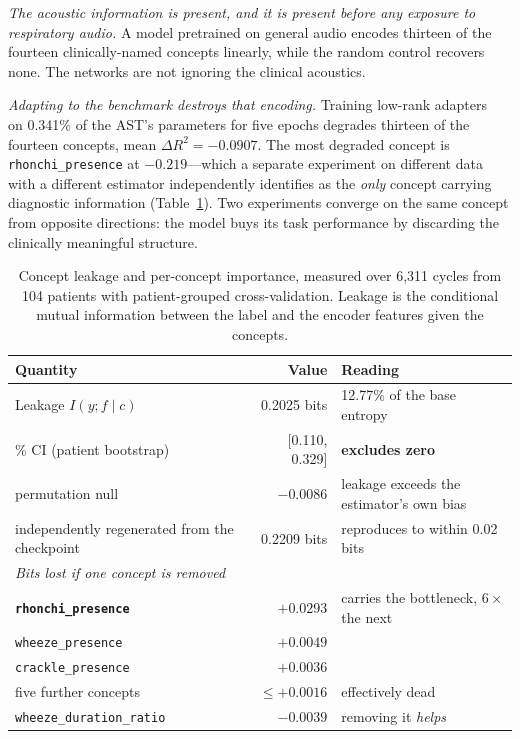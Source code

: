 \documentclass[journal,onecolumn]{IEEEtran}
\newcommand{\best}[1]{\textbf{#1}}
\begin{document}
\emph{The acoustic information is present, and it is present before any exposure
to respiratory audio.} A model pretrained on general audio encodes thirteen of the
fourteen clinically-named concepts linearly, while the random control recovers
none. The networks are not ignoring the clinical acoustics.

\emph{Adapting to the benchmark destroys that encoding.} Training low-rank
adapters~\cite{hu2022lora} on 0.341\% of the AST's parameters for five epochs
degrades thirteen of the
fourteen concepts, mean $\Delta R^2 = -0.0907$. The most degraded concept is
\texttt{rhonchi\_presence} at $-0.219$---which a separate experiment on different
data with a different estimator independently identifies as the \emph{only}
concept carrying diagnostic information (Table~\ref{tab:leakage}). Two experiments
converge on the same concept from opposite directions: the model buys its task
performance by discarding the clinically meaningful structure.

\begin{table}[!t]
\centering
\caption{Concept leakage and per-concept importance, measured over 6{,}311 cycles
from 104 patients with patient-grouped cross-validation. Leakage is the conditional
mutual information between the label and the encoder features given the concepts.}
\label{tab:leakage}
\small
\begin{tabular}{lrl}
\toprule
Quantity & Value & Reading \\
\midrule
Leakage $I(y;f\mid c)$ & 0.2025 bits & 12.77\% of the base entropy \\
\quad 95\% CI (patient bootstrap) & [0.110, 0.329] & \best{excludes zero} \\
\quad permutation null & $-0.0086$ & leakage exceeds the estimator's own bias \\
\quad independently regenerated from the checkpoint & 0.2209 bits & reproduces to within 0.02 bits \\
\midrule
\multicolumn{3}{l}{\emph{Bits lost if one concept is removed}}\\
\best{\texttt{rhonchi\_presence}}  & \best{$+0.0293$} & carries the bottleneck, $6\times$ the next \\
\texttt{wheeze\_presence}          & $+0.0049$ & \\
\texttt{crackle\_presence}         & $+0.0036$ & \\
five further concepts              & $\leq +0.0016$ & effectively dead \\
\texttt{wheeze\_duration\_ratio}   & $-0.0039$ & removing it \emph{helps} \\
\bottomrule
\end{tabular}
\end{table}
\end{document}
